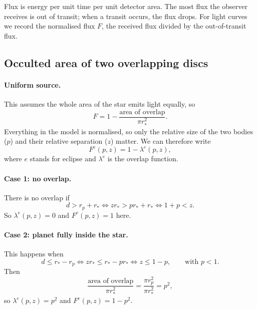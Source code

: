 \documentclass[11pt,a4paper]{article}
\begin{document}
Flux is energy per unit time per unit detector area. The most flux the observer
receives is out of transit; when a transit occurs, the flux drops. For light
curves we record the normalised flux $F$, the received flux divided by the
out-of-transit flux.

\subsection{Occulted area of two overlapping discs}
\label{sec:app-geometry}

\paragraph{Uniform source.}
This assumes the whole area of the star emits light equally, so
\begin{equation}
  F = 1 - \frac{\text{area of overlap}}{\pi r_*^2}.
\end{equation}
Everything in the model is normalised, so only the relative size of the two
bodies ($p$) and their relative separation ($z$) matter. We can therefore write
\begin{equation}
  F^{e}(p,z) = 1 - \lambda^{e}(p,z),
\end{equation}
where $e$ stands for eclipse and $\lambda^{e}$ is the overlap function.

\paragraph{Case 1: no overlap.}
There is no overlap if
\begin{equation}
  d > r_p + r_* \iff z r_* > p r_* + r_* \iff 1 + p < z .
\end{equation}
So $\lambda^{e}(p,z) = 0$ and $F^{e}(p,z) = 1$ here.

\paragraph{Case 2: planet fully inside the star.}
This happens when
\begin{equation}
  d \le r_* - r_p \iff z r_* \le r_* - p r_* \iff z \le 1 - p,
  \qquad \text{with } p < 1 .
\end{equation}
Then
\begin{equation}
  \frac{\text{area of overlap}}{\pi r_*^2} = \frac{\pi r_p^2}{\pi r_*^2} = p^2,
\end{equation}
so $\lambda^{e}(p,z) = p^2$ and $F^{e}(p,z) = 1 - p^2$.
\end{document}
